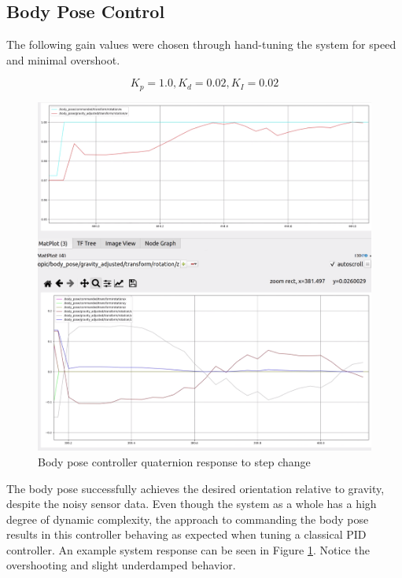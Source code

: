 \subsection{ Body Pose Control }
The following gain values were chosen through hand-tuning the system for speed and minimal overshoot. 

\[K_p = 1.0, K_d = 0.02, K_I = 0.02\]

\begin{figure}[H]
    \centerline{\includegraphics[scale=0.1]{./06_results/figures/pose_step_control.png}}
    \caption{ Body pose controller quaternion response to step change}
    \label{fig:pose_control_response}
\end{figure}

The body pose successfully achieves the desired orientation relative to gravity, despite the noisy sensor data. Even though the system as a whole has a high degree of dynamic complexity, the approach to commanding the body pose results in this controller behaving as expected when tuning a classical PID controller. An example system response can be seen in Figure \ref{fig:pose_control_response}. Notice the overshooting and slight underdamped behavior.
